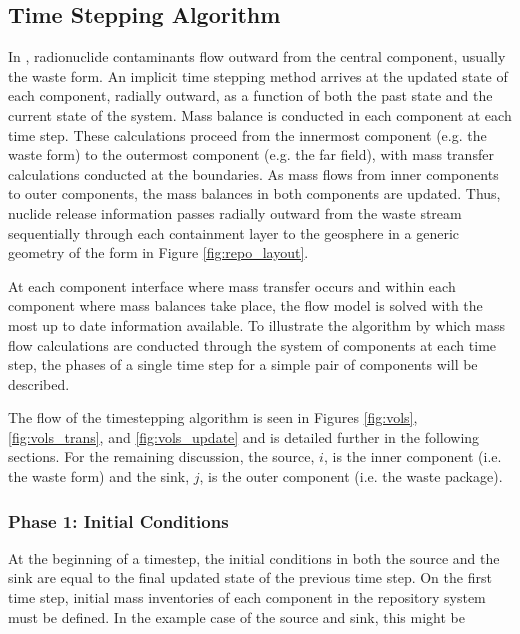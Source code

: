 \subsection{Time Stepping Algorithm}\label{sec:time stepping}

In \Cyder, radionuclide contaminants flow outward from the central component,
usually the waste form. An implicit time stepping method arrives at the updated
state of each component, radially outward, as a function of both the past state
and the current state of the system. Mass balance is conducted in each
component at each time step. These calculations proceed from the innermost
component (e.g. the waste form) to the outermost component (e.g. the far field), with mass transfer calculations conducted
at the boundaries. As mass flows from inner components to outer components, the
mass balances in both components are updated.  Thus, nuclide release
information passes radially outward from the waste stream sequentially through
each containment layer to the geosphere in a generic geometry of the form in
Figure \ref{fig:repo_layout}.

At each component interface where mass transfer occurs and within each component
where mass balances take place, the flow model is solved with the most up to
date information available.  To illustrate the algorithm by which mass flow
calculations are conducted through the system of components at each time step,
the phases of a single time step for a simple pair of components will be
described.

The flow of the timestepping algorithm is seen in Figures \ref{fig:vols}, 
\ref{fig:vols_trans}, and \ref{fig:vols_update} and is detailed further in the 
following sections.  For the remaining discussion, the source, $i$, is the 
inner component (i.e. the waste form) and the sink, $j$, is the outer component 
(i.e. the waste package).



\FloatBarrier


\subsubsection{Phase 1: Initial Conditions}

At the beginning of a timestep, the initial conditions in both the source and
the sink are equal to the final updated state of the previous time step.
On the first time step, initial mass inventories of each component in
the repository system must be defined. In the example case of the source and 
sink, this might be

